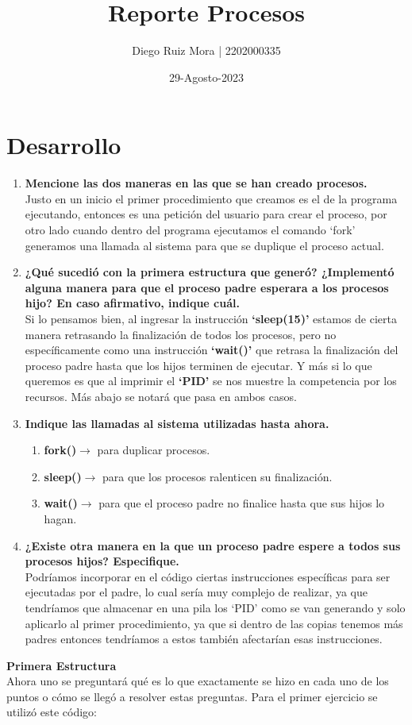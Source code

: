 \documentclass[11pt]{article}
\title{\textbf{Reporte Procesos}}
\author{Diego Ruiz Mora | 2202000335}
\date{29-Agosto-2023}
\begin{document}
\maketitle
\section{Desarrollo}
\begin{enumerate}
\item \textbf{Mencione las dos maneras en las que se han creado procesos.}
\\
Justo en un inicio el primer procedimiento que creamos es el de la programa ejecutando, entonces es una petición del usuario para crear el proceso, por otro lado cuando dentro del programa ejecutamos el comando ‘fork’ generamos una llamada al sistema para que se duplique el proceso actual. 
\item \textbf{¿Qué sucedió con la primera estructura que generó? ¿Implementó alguna manera
para que el proceso padre esperara a los procesos hijo? En caso afirmativo,
indique cuál.}
\\
Si lo pensamos bien, al ingresar la instrucción \textbf{‘sleep(15)’} estamos de cierta manera retrasando la finalización de todos los procesos, pero no específicamente como una instrucción \textbf{‘wait()’} que retrasa la finalización del proceso padre hasta que los hijos terminen de ejecutar. Y más si lo que queremos es que al imprimir el \textbf{‘PID’} se nos muestre la competencia por los recursos. Más abajo se notará que pasa en ambos casos.
\item \textbf{Indique las llamadas al sistema utilizadas hasta ahora.}
\begin{enumerate}
	 \item \textbf{fork()}$\longrightarrow$ para duplicar procesos.
	 \item \textbf{sleep()}$\longrightarrow$ para que los procesos ralenticen su finalización. 
	 \item \textbf{wait()}$ \longrightarrow$ para que el proceso padre no finalice hasta que sus hijos lo hagan. 
\end{enumerate}
\item \textbf{¿Existe otra manera en la que un proceso padre espere a todos sus procesos hijos? Especifique.}
\\
Podríamos incorporar en el código ciertas instrucciones específicas para ser ejecutadas por el padre, lo cual sería muy complejo de realizar, ya que tendríamos que almacenar en una pila los ‘PID’ como se van generando y solo aplicarlo al primer procedimiento, ya que si dentro de las copias tenemos más padres entonces tendríamos a estos también afectarían esas instrucciones. 
\end{enumerate}
\pagebreak
\textbf{Primera Estructura}
\\
Ahora uno se preguntará qué es lo que exactamente se hizo en cada uno de los puntos o cómo se llegó a resolver estas preguntas. Para el primer ejercicio se utilizó este código:
\end{document}
